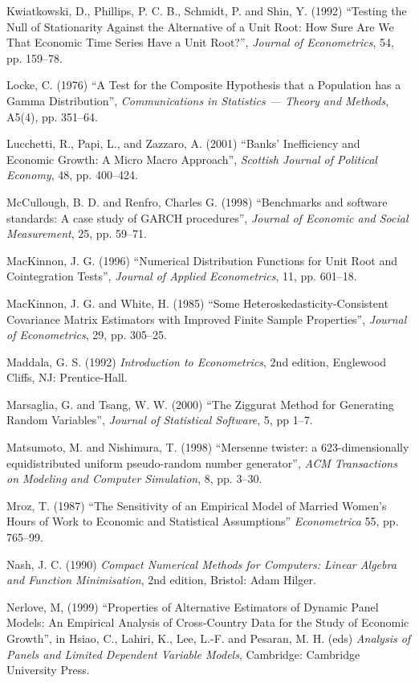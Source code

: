 \begin{thebibliography}
  Kwiatkowski, D., Phillips, P. C. B., Schmidt, P. and Shin, Y. (1992)
  ``Testing the Null of Stationarity Against the Alternative of a Unit
  Root: How Sure Are We That Economic Time Series Have a Unit Root?'',
  \emph{Journal of Econometrics}, 54, pp. 159--78.

  Locke, C. (1976) ``A Test for the Composite Hypothesis that a
  Population has a Gamma Distribution'', \emph{Communications in
    Statistics --- Theory and Methods}, A5(4), pp. 351--64.
  
  Lucchetti, R., Papi, L., and Zazzaro, A. (2001) ``Banks'
  Inefficiency and Economic Growth: A Micro Macro Approach'',
  \emph{Scottish Journal of Political Economy}, 48, pp. 400--424.

  McCullough, B. D. and Renfro, Charles G. (1998) ``Benchmarks and
  software standards: A case study of GARCH procedures'',
  \emph{Journal of Economic and Social Measurement}, 25, pp. 59--71.

  MacKinnon, J. G. (1996) ``Numerical Distribution Functions for Unit
  Root and Cointegration Tests'', \emph{Journal of Applied
    Econometrics}, 11, pp. 601--18.
  
  MacKinnon, J. G. and White, H. (1985) ``Some
  Heteroskedasticity-Consistent Covariance Matrix Estimators with
  Improved Finite Sample Properties'', \emph{Journal of Econometrics},
  29, pp. 305--25.
  
  Maddala, G. S. (1992) \emph{Introduction to Econometrics}, 2nd
  edition, Englewood Cliffs, NJ: Prentice-Hall.

  Marsaglia, G. and Tsang, W. W. (2000) ``The Ziggurat Method for
  Generating Random Variables'', \emph{Journal of Statistical
    Software}, 5, pp 1--7. 
  
  Matsumoto, M. and Nishimura, T.  (1998) ``Mersenne twister: a
  623-dimensionally equidistributed uniform pseudo-random number
  generator'', \emph{ACM Transactions on Modeling and Computer
    Simulation}, 8, pp. 3--30.

  Mroz, T. (1987) ``The Sensitivity of an Empirical Model of Married
  Women's Hours of Work to Economic and Statistical Assumptions''
  \emph{Econometrica} 55, pp. 765--99.

  Nash, J. C. (1990) \emph{Compact Numerical Methods for Computers:
    Linear Algebra and Function Minimisation}, 2nd edition, Bristol:
  Adam Hilger.

  Nerlove, M, (1999) ``Properties of Alternative Estimators of Dynamic
  Panel Models: An Empirical Analysis of Cross-Country Data for the
  Study of Economic Growth'', in Hsiao, C., Lahiri, K., Lee, L.-F. and
  Pesaran, M. H. (eds) \emph{Analysis of Panels and Limited Dependent
    Variable Models}, Cambridge: Cambridge University Press.
    

\end{thebibliography}
